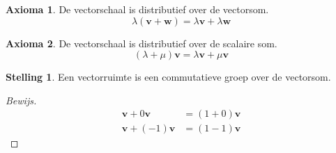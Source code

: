 \documentclass{amsart}
\theoremstyle{definition}
\newtheorem{axm}{Axioma}[section]
\newtheorem{thm}{Stelling}[section]
\newenvironment{bewijs}{\begin{proof}[Bewijs]}{\end{proof}}
\newcommand{\vvec}[1][v]{\mathbf{#1}}
\begin{document}
\begin{axm}
    De vectorschaal is distributief over de vectorsom.
    \begin{equation*}
        \lambda(\vvec + \vvec[w]) = \lambda \vvec + \lambda \vvec[w]
    \end{equation*}
\end{axm}

\begin{axm}
    De vectorschaal is distributief over de scalaire som.
    \begin{equation*}
        (\lambda + \mu)\vvec = \lambda \vvec + \mu \vvec
    \end{equation*}
\end{axm}

\begin{thm}
    Een vectorruimte is een commutatieve groep over de vectorsom.
    \begin{bewijs}
        \begin{align*}
            \vvec + 0\vvec    & = (1+0)\vvec \\
            \vvec + (-1)\vvec & = (1-1)\vvec
        \end{align*}
    \end{bewijs}
\end{thm}
\end{document}
